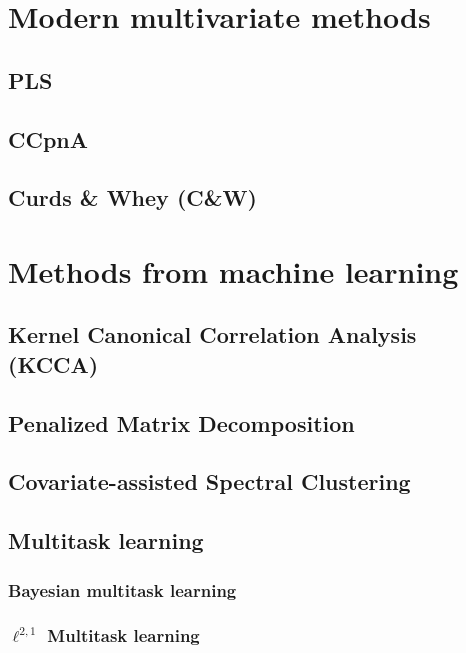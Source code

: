 \documentclass{report}
\begin{document}
\section{Modern multivariate methods}

\subsection{PLS}
\label{sec:PLS}

\subsection{CCpnA}
\label{sec:canonical-correspondence}

\subsection{Curds \& Whey (C\&W)}
\label{sec:cw}

\section{Methods from machine learning}

\subsection{Kernel Canonical Correlation Analysis (KCCA)}

\subsection{Penalized Matrix Decomposition}

\subsection{Covariate-assisted Spectral Clustering}

\subsection{Multitask learning}
\label{sec:multitask}

\subsubsection{Bayesian multitask learning}

\subsubsection{$\ell^{2, 1}$ Multitask learning}
\end{document}
